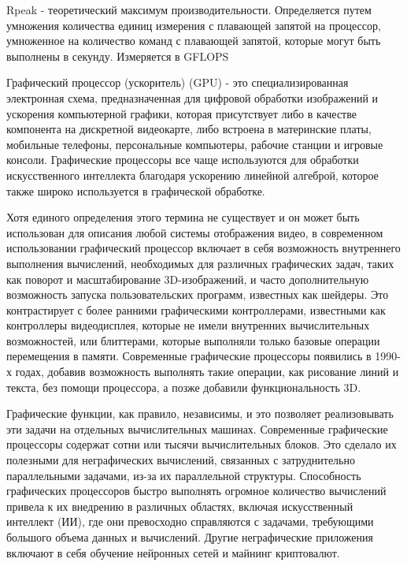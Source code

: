 \documentclass[14pt,a4paper]{extarticle}
\begin{document}
\begin{sloppypar}
Rpeak - теоретический максимум производительности. Определяется путем умножения
количества единиц измерения с плавающей запятой на процессор, умноженное на
количество команд с плавающей запятой, которые могут быть выполнены в секунду.
Измеряется в GFLOPS

Графический процессор (ускоритель) (GPU) - это специализированная электронная
схема, предназначенная для цифровой обработки изображений и ускорения
компьютерной графики, которая присутствует либо в качестве компонента на
дискретной видеокарте, либо встроена в материнские платы, мобильные телефоны,
персональные компьютеры, рабочие станции и игровые консоли. Графические
процессоры все чаще используются для обработки искусственного интеллекта
благодаря ускорению линейной алгеброй, которое также широко используется в
графической обработке.

Хотя единого определения этого термина не существует и он может быть
использован для описания любой системы отображения видео, в современном
использовании графический процессор включает в себя возможность внутреннего
выполнения вычислений, необходимых для различных графических задач, таких как
поворот и масштабирование 3D-изображений, и часто дополнительную возможность
запуска пользовательских программ, известных как шейдеры. Это контрастирует с
более ранними графическими контроллерами, известными как контроллеры
видеодисплея, которые не имели внутренних вычислительных возможностей, или
блиттерами, которые выполняли только базовые операции перемещения в памяти.
Современные графические процессоры появились в 1990-х годах, добавив
возможность выполнять такие операции, как рисование линий и текста, без помощи
процессора, а позже добавили функциональность 3D.

Графические функции, как правило, независимы, и это позволяет реализовывать эти
задачи на отдельных вычислительных машинах. Современные графические процессоры
содержат сотни или тысячи вычислительных блоков. Это сделало их полезными для
неграфических вычислений, связанных с затруднительно параллельными задачами,
из-за их параллельной структуры. Способность графических процессоров быстро
выполнять огромное количество вычислений привела к их внедрению в различных
областях, включая искусственный интеллект (ИИ), где они превосходно справляются
с задачами, требующими большого объема данных и вычислений. Другие
неграфические приложения включают в себя обучение нейронных сетей и майнинг
криптовалют.

\end{sloppypar}
\end{document}
